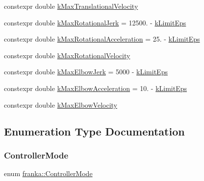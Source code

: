 \begin{DoxyCompactItemize}
\item 
constexpr double \hyperlink{namespacefranka_a857e1e5e18d688ec7095264a629bf474}{k\+Max\+Translational\+Velocity}
\item 
constexpr double \hyperlink{namespacefranka_a259520ce1b6b5b85a88d05262286820d}{k\+Max\+Rotational\+Jerk} = 12500. -\/ \hyperlink{namespacefranka_aad1f9b575274830b8da9e638559d424b}{k\+Limit\+Eps}
\item 
constexpr double \hyperlink{namespacefranka_a5e3d5c95ba72f9660f17f8ebf1e0aa2e}{k\+Max\+Rotational\+Acceleration} = 25. -\/ \hyperlink{namespacefranka_aad1f9b575274830b8da9e638559d424b}{k\+Limit\+Eps}
\item 
constexpr double \hyperlink{namespacefranka_aafb1f5ef8f8a7abd546edea498c18b45}{k\+Max\+Rotational\+Velocity}
\item 
constexpr double \hyperlink{namespacefranka_adc70178204d4da073c78de777a2dff74}{k\+Max\+Elbow\+Jerk} = 5000 -\/ \hyperlink{namespacefranka_aad1f9b575274830b8da9e638559d424b}{k\+Limit\+Eps}
\item 
constexpr double \hyperlink{namespacefranka_af365e574ad7b1580ce15e30dd909b3ba}{k\+Max\+Elbow\+Acceleration} = 10. -\/ \hyperlink{namespacefranka_aad1f9b575274830b8da9e638559d424b}{k\+Limit\+Eps}
\item 
constexpr double \hyperlink{namespacefranka_a2896b2e0c8bd96f9ee242c1203ac3483}{k\+Max\+Elbow\+Velocity}
\end{DoxyCompactItemize}


\subsection{Enumeration Type Documentation}
\mbox{\label{namespacefranka_a3e20bc77587e2c0c53598753e3f4816b}} 
\subsubsection{\texorpdfstring{Controller\+Mode}{ControllerMode}}
{\footnotesize\ttfamily enum \hyperlink{namespacefranka_a3e20bc77587e2c0c53598753e3f4816b}{franka\+::\+Controller\+Mode}\hspace{0.3cm}{\ttfamily [strong]}}


